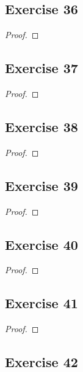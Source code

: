 \documentclass[14pt]{extarticle}
\begin{document}
\subsection{Exercise 36}

\begin{proof}

\end{proof}

\subsection{Exercise 37}

\begin{proof}

\end{proof}

\subsection{Exercise 38}

\begin{proof}

\end{proof}

\subsection{Exercise 39}

\begin{proof}

\end{proof}

\subsection{Exercise 40}

\begin{proof}

\end{proof}

\subsection{Exercise 41}

\begin{proof}

\end{proof}

\subsection{Exercise 42}
\end{document}
